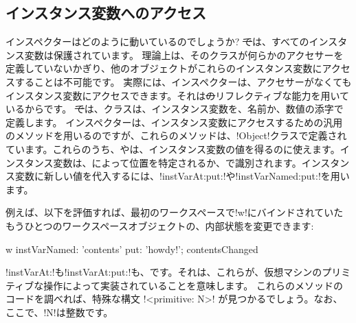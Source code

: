\documentclass[a4paper,10pt,twoside]{book}
\begin{document}
\subsection{インスタンス変数へのアクセス}

インスペクターはどのように動いているのでしょうか?
\st では、すべてのインスタンス変数は保護されています。
理論上は、そのクラスが何らかのアクセサーを定義していないかぎり、他のオブジェクトがこれらのインスタンス変数にアクセスすることは不可能です。
実際には、インスペクターは、アクセサーがなくてもインスタンス変数にアクセスできます。それは\st のリフレクティブな能力を用いているからです。
\st では、クラスは、インスタンス変数を、名前か、数値の添字で定義します。
インスペクターは、インスタンス変数にアクセスするための汎用のメソッドを用いるのですが、これらのメソッドは、\ct!Object!クラスで定義されています。これらのうち、やは、インスタンス変数の値を得るのに使えます。インスタンス変数は、によって位置を特定されるか、で識別されます。インスタンス変数に新しい値を代入するには、\ct!instVarAt:put:!や\ct!instVarNamed:put:!を用います。

例えば、以下を評価すれば、最初のワークスペースで\ct!w!にバインドされていたもうひとつのワークスペースオブジェクトの、内部状態を変更できます:
\begin{code}{}
w instVarNamed: 'contents' put: 'howdy!'; contentsChanged
\end{code}


\ct!instVarAt:!も\ct!instVarAt:put:!も、です。それは、これらが、\pharo 仮想マシンのプリミティブな操作によって実装されていることを意味します。
これらのメソッドのコードを調べれば、特殊な構文 \ct!<primitive: N>! が見つかるでしょう。なお、ここで、\ct!N!は整数です。
\end{document}
